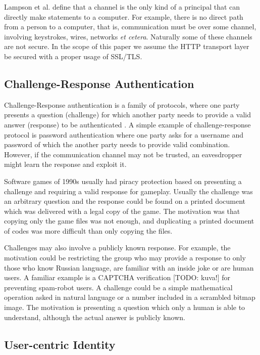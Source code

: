 \documentclass{tktltiki}
\begin{document}
          Lampson et al. \cite{lampson_distributed_1992} define that a channel is the only kind of a principal that can directly make statements to a computer. For example, there is no direct path from a person to a computer, that is, communication must be over some channel, involving keystrokes, wires, networks 
\emph{et cetera}. Naturally some of these channels are not secure. In the scope of this paper we assume the HTTP transport layer be secured with a proper usage of SSL/TLS.



\subsection{Challenge-Response Authentication}

      Challenge-Response authentication is a family of protocols, where one party presents a question (challenge) for which another party needs to provide a valid answer (response) to be authenticated \cite{wikipedia:Challenge-response_authentication}. A simple example of challenge-response protocol is password authentication where one party asks for a username and password of which the another party needs to provide valid combination. However, if the communication channel may not be trusted, an eavesdropper might learn the response and exploit it.

      Software games of 1990s usually had piracy protection based on presenting a challenge and requiring a valid response for gameplay. Usually the challenge was an arbitrary question and the response could be found on a printed document which was delivered with a legal copy of the game. The motivation was that copying only the game files was not enough, and duplicating a printed document of codes was more difficult than only copying the files.

      Challenges may also involve a publicly known response. For example, the motivation could be restricting the group who may provide a response to only those who know Russian language, are familiar with an inside joke or are human users. A familiar example is a CAPTCHA verification [TODO: kuva!] for preventing spam-robot users. A challenge could be a simple mathematical operation asked in natural language or a number included in a scrambled bitmap image. The motivation is presenting a question which only a human is able to understand, although the actual answer is publicly known.



\subsection{User-centric Identity}
\end{document}
